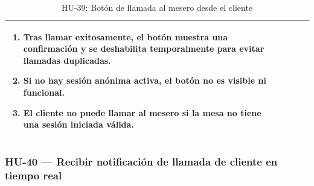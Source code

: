 \begin{table}[H]
\begin{tabularx}{\textwidth}{|>{\bfseries}p{3.5cm}|X|>{\bfseries}p{3.5cm}|X|}
{\begin{enumerate}[leftmargin=1.5em, itemsep=0pt, parsep=2pt, topsep=0pt]
    \item Tras llamar exitosamente, el botón muestra una confirmación y se deshabilita temporalmente para evitar llamadas duplicadas.
    \item Si no hay sesión anónima activa, el botón no es visible ni funcional.
    \item El cliente no puede llamar al mesero si la mesa no tiene una sesión iniciada válida.
  \end{enumerate}
} \\
\hline
\end{tabularx}
\caption{HU-39: Botón de llamada al mesero desde el cliente}
\end{table}

\subsubsection*{HU-40 — Recibir notificación de llamada de cliente en tiempo real}
